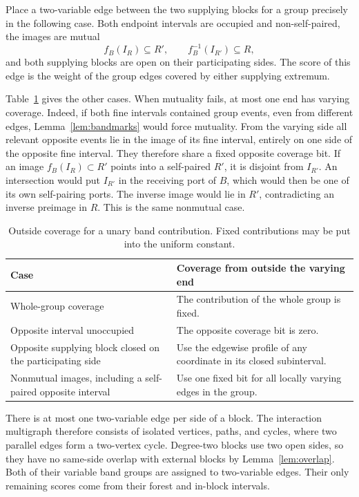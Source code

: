 \documentclass[10pt,letterpaper]{article}
\begin{document}
Place a two-variable edge between the two supplying blocks for a group precisely in the following case. Both endpoint intervals are occupied and non-self-paired, the images are mutual
\[
                f_B(I_R)\subseteq R',\qquad f_B^{-1}(I_{R'})\subseteq R,
\]
and both supplying blocks are open on their participating sides. The score of this edge is the weight of the group edges covered by either supplying extremum.

Table~\ref{tab:outside} gives the other cases. When mutuality fails, at most one end has varying coverage. Indeed, if both fine intervals contained group events, even from different edges, Lemma~\ref{lem:bandmarks} would force mutuality. From the varying side all relevant opposite events lie in the image of its fine interval, entirely on one side of the opposite fine interval. They therefore share a fixed opposite coverage bit. If an image \(f_B(I_R)\subset R'\) points into a self-paired \(R'\), it is disjoint from \(I_{R'}\). An intersection would put \(I_{R'}\) in the receiving port of \(B\), which would then be one of its own self-pairing ports. The inverse image would lie in \(R'\), contradicting an inverse preimage in \(R\). This is the same nonmutual case.

\begin{table}[H]
\centering
\caption{Outside coverage for a unary band contribution. Fixed contributions may be put into the uniform constant.}
\label{tab:outside}
\begin{tabularx}{.96\linewidth}{@{}p{.36\linewidth}X@{}}
\toprule
Case & Coverage from outside the varying end\\
\midrule
Whole-group coverage & The contribution of the whole group is fixed.\\
Opposite interval unoccupied & The opposite coverage bit is zero.\\
Opposite supplying block closed on the participating side &
Use the edgewise profile of any coordinate in its closed subinterval.\\
Nonmutual images, including a self-paired opposite interval &
Use one fixed bit for all locally varying edges in the group.\\
\bottomrule
\end{tabularx}
\end{table}

There is at most one two-variable edge per side of a block. The interaction multigraph therefore consists of isolated vertices, paths, and cycles, where two parallel edges form a two-vertex cycle. Degree-two blocks use two open sides, so they have no same-side overlap with external blocks by Lemma~\ref{lem:overlap}. Both of their variable band groups are assigned to two-variable edges. Their only remaining scores come from their forest and in-block intervals.
\end{document}
